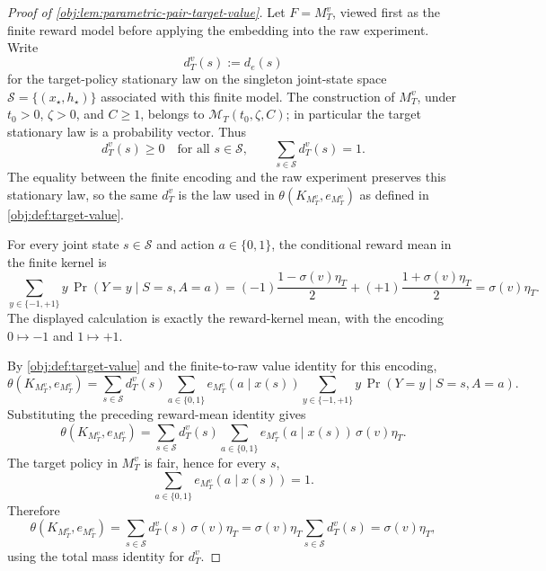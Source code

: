 \documentclass[11pt]{article}
\begin{document}
\begin{proof}[Proof of \cref{obj:lem:parametric-pair-target-value}]
Let \(F=M_T^v\), viewed first as the finite reward model before applying the embedding into the raw experiment.  Write
\[
d_T^v(s)
:=
d_e(s)
\]
for the target-policy stationary law on the singleton joint-state space \(\mathcal S=\{(x_\star,h_\star)\}\) associated with this finite model.  The construction of \(M_T^v\), under \(t_0>0\), \(\zeta>0\), and \(C\ge 1\), belongs to \(\mathcal M_T(t_0,\zeta,C)\); in particular the target stationary law is a probability vector.  Thus
\[
d_T^v(s)\ge 0
\quad\text{for all }s\in\mathcal S,
\qquad
\sum_{s\in\mathcal S}d_T^v(s)=1 .
\]
The equality between the finite encoding and the raw experiment preserves this stationary law, so the same \(d_T^v\) is the law used in \(\theta(K_{M_T^v},e_{M_T^v})\) as defined in \cref{obj:def:target-value}. %

For every joint state \(s\in\mathcal S\) and action \(a\in\{0,1\}\), the conditional reward mean in the finite kernel is
\[
\sum_{y\in\{-1,+1\}}
y\,\Pr(Y=y\mid S=s,A=a)
=
(-1)\frac{1-\sigma(v)\eta_T}{2}
+
(+1)\frac{1+\sigma(v)\eta_T}{2}
=
\sigma(v)\eta_T .
\]
The displayed calculation is exactly the reward-kernel mean, with the encoding \(0\mapsto -1\) and \(1\mapsto +1\). %

By \cref{obj:def:target-value} and the finite-to-raw value identity for this encoding,
\[
\theta(K_{M_T^v},e_{M_T^v})
=
\sum_{s\in\mathcal S}
d_T^v(s)
\sum_{a\in\{0,1\}}
e_{M_T^v}(a\mid x(s))
\sum_{y\in\{-1,+1\}}
y\,\Pr(Y=y\mid S=s,A=a).
\]
Substituting the preceding reward-mean identity gives
\[
\theta(K_{M_T^v},e_{M_T^v})
=
\sum_{s\in\mathcal S}
d_T^v(s)
\sum_{a\in\{0,1\}}
e_{M_T^v}(a\mid x(s))\,\sigma(v)\eta_T .
\]
The target policy in \(M_T^v\) is fair, hence for every \(s\),
\[
\sum_{a\in\{0,1\}}e_{M_T^v}(a\mid x(s))=1 .
\]
Therefore
\[
\theta(K_{M_T^v},e_{M_T^v})
=
\sum_{s\in\mathcal S}d_T^v(s)\,\sigma(v)\eta_T
=
\sigma(v)\eta_T\sum_{s\in\mathcal S}d_T^v(s)
=
\sigma(v)\eta_T ,
\]
using the total mass identity for \(d_T^v\). %
\end{proof}
\end{document}
